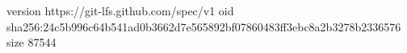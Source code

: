 version https://git-lfs.github.com/spec/v1
oid sha256:24c5b996c64b541ad0b3662d7e565892bf07860483ff3ebc8a2b3278b2336576
size 87544
